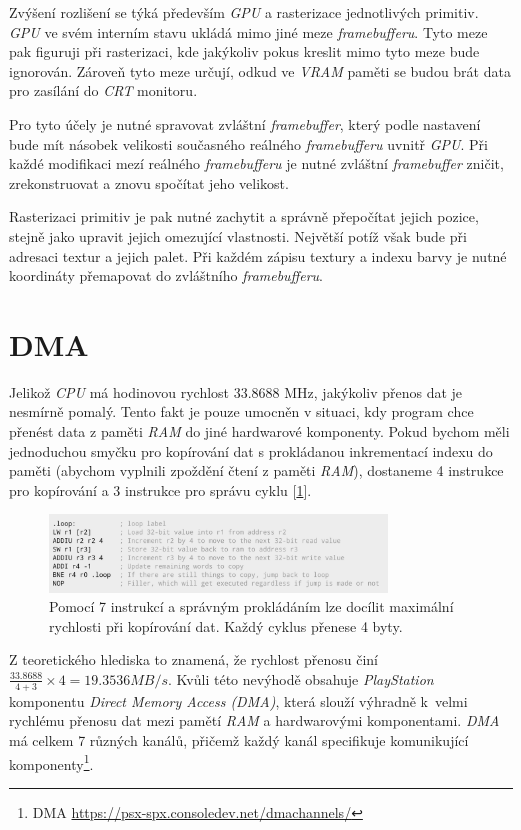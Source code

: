 Zvýšení rozlišení se týká především \textit{GPU} a rasterizace jednotlivých primitiv. 
\textit{GPU} ve svém interním stavu ukládá mimo jiné meze \textit{framebufferu}. 
Tyto meze pak figuruji při rasterizaci, kde jakýkoliv pokus kreslit mimo tyto meze bude ignorován. 
Zároveň tyto meze určují, odkud ve \textit{VRAM} paměti se budou brát data pro zasílání 
do \textit{CRT} monitoru.

Pro tyto účely je nutné spravovat zvláštní \textit{framebuffer}, který podle nastavení 
bude mít násobek velikosti současného reálného \textit{framebufferu} uvnitř \textit{GPU}. 
Při každé modifikaci mezí reálného \textit{framebufferu} je nutné zvláštní \textit{framebuffer} 
zničit, zrekonstruovat a znovu spočítat jeho velikost.

Rasterizaci primitiv je pak nutné zachytit a správně přepočítat jejich pozice, stejně jako 
upravit jejich omezující vlastnosti. Největší potíž však bude při adresaci textur a jejich palet. 
Při každém zápisu textury a indexu barvy je nutné koordináty přemapovat do zvláštního \textit{framebufferu}.

\section{DMA}

Jelikož \textit{CPU} má hodinovou rychlost 33.8688 MHz, jakýkoliv přenos dat je nesmírně pomalý. 
Tento fakt je pouze umocněn v situaci, kdy program chce přenést data z paměti \textit{RAM} do jiné hardwarové komponenty. 
Pokud bychom měli jednoduchou smyčku pro kopírování dat s prokládanou inkrementací indexu do paměti (abychom vyplnili zpoždění čtení z paměti \textit{RAM}),
dostaneme 4 instrukce pro kopírování a 3 instrukce pro správu cyklu [\ref{slow-copy}].

\begin{figure}[hbt]
	\centering
	\includegraphics[width=0.8\textwidth]{obrazky-figures/slow-copy.png}
	\caption{Pomocí 7 instrukcí a správným prokládáním lze docílit maximální rychlosti při kopírování dat. Každý cyklus přenese 4 byty.}
	\label{slow-copy}
\end{figure}

Z teoretického hlediska to znamená, že rychlost přenosu činí $\frac{33.8688}{4+3}\times4 = 19.3536 MB/s$. 
Kvůli této nevýhodě obsahuje \textit{PlayStation} komponentu \textit{Direct Memory Access (DMA)}, 
která slouží výhradně k~velmi rychlému přenosu dat mezi pamětí \textit{RAM} a hardwarovými komponentami. 
\textit{DMA} má celkem 7 různých kanálů, přičemž každý kanál specifikuje komunikující komponenty\footnote{DMA\cite{PSXSpec} \url{https://psx-spx.consoledev.net/dmachannels/}}.

